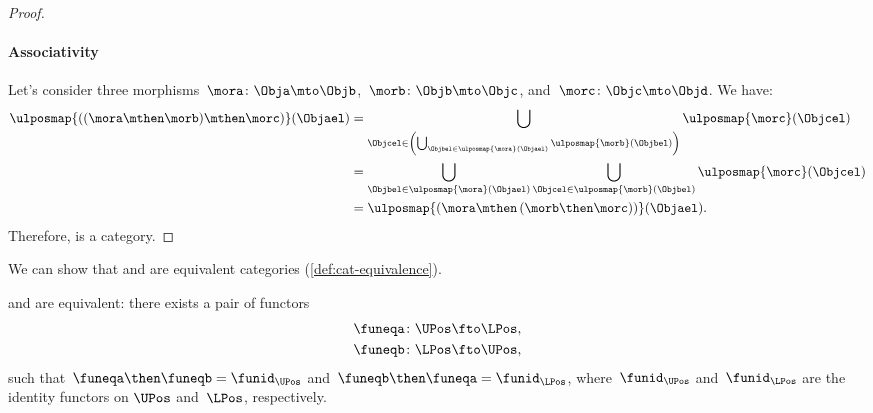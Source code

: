 \begin{proof}
    \paragraph*{Associativity} Let's consider three morphisms~$\mora\colon \Obja \mto \Objb$,~$\morb\colon \Objb\mto \Objc$, and~$\morc\colon \Objc\mto \Objd$.
    We have:
    \begin{equation*}
        \begin{aligned}
            \ulposmap{\left( (\mora \mthen \morb) \mthen \morc\right)}(\Objael)&=
            \bigcup_{\Objcel \in \left( \bigcup_{\Objbel \in \ulposmap{\mora}(\Objael)}\ulposmap{\morb}(\Objbel)\right)}\ulposmap{\morc}(\Objcel)\\
            &=\bigcup_{\Objbel\in \ulposmap{\mora}(\Objael)}\bigcup_{\Objcel\in \ulposmap{\morb}(\Objbel)}\ulposmap{\morc}(\Objcel)\\
            &=\ulposmap{\left( \mora \mthen \left( \morb\then \morc\right)\right)}(\Objael).
        \end{aligned}
    \end{equation*}
    Therefore, \UPos is a category.
\end{proof}



We can show that \UPos and \LPos are equivalent categories (\cref{def:cat-equivalence}).

\begin{lemma}
    \label{lem:ulposequiv}
    \UPos and \LPos are equivalent: there exists a pair of functors
    \begin{equation}
        \begin{aligned}
            \funeqa\colon \UPos&\fto \LPos,\\
            \funeqb\colon \LPos&\fto \UPos,
        \end{aligned}
    \end{equation}
    such that~$\funeqa \then \funeqb=\funid_{\UPos}$ and~$\funeqb \then \funeqa=\funid_{\LPos}$, where~$\funid_{\UPos}$ and~$\funid_{\LPos}$ are the identity functors on $\UPos$ and~$\LPos$, respectively.
\end{lemma}

